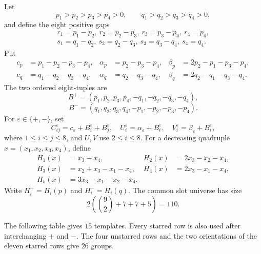 Let
\[
 p_1>p_2>p_3>p_4>0,
 \qquad q_1>q_2>q_3>q_4>0,
\]
and define the eight positive gaps
\[
\begin{gathered}
 r_1=p_1-p_2,\ r_2=p_2-p_3,\ r_3=p_3-p_4,\ r_4=p_4,\\
 s_1=q_1-q_2,\ s_2=q_2-q_3,\ s_3=q_3-q_4,\ s_4=q_4.
\end{gathered}
\]
Put
\[
\begin{aligned}
 c_p&=p_1-p_2-p_3-p_4,&
 \alpha_p&=p_2-p_3-p_4,&
 \beta_p&=2p_2-p_1-p_3-p_4,\\
 c_q&=q_1-q_2-q_3-q_4,&
 \alpha_q&=q_2-q_3-q_4,&
 \beta_q&=2q_2-q_1-q_3-q_4.
\end{aligned}
\]
The two ordered eight-tuples are
\[
 B^+=(p_1,p_2,p_3,p_4,-q_1,-q_2,-q_3,-q_4),
\]
\[
 B^-=(q_1,q_2,q_3,q_4,-p_1,-p_2,-p_3,-p_4).
\]
For $\varepsilon\in\{+,-\}$, set
\[
 C^\varepsilon_{ij}=c_\varepsilon+B^\varepsilon_i+B^\varepsilon_j,
 \quad
 U^\varepsilon_i=\alpha_\varepsilon+B^\varepsilon_i,
 \quad
 V^\varepsilon_i=\beta_\varepsilon+B^\varepsilon_i,
\]
where $1\leq i\leq j\leq8$, and $U,V$ use $2\leq i\leq8$.  For a decreasing
quadruple $x=(x_1,x_2,x_3,x_4)$, define
\[
\begin{aligned}
 H_1(x)&=x_3-x_4,& H_2(x)&=2x_3-x_2-x_4,\\
 H_3(x)&=x_2+x_3-x_1-x_4,& H_4(x)&=2x_3-x_1-x_4,\\
 H_5(x)&=3x_3-x_1-x_2-x_4.
\end{aligned}
\]
Write $H_i^+=H_i(p)$ and $H_i^-=H_i(q)$.  The common slot universe has size
\[
 2\left(\binom{9}{2}+7+7+5\right)=110.
\]

The following table gives $15$ templates.  Every starred row is also used
after interchanging $+$ and $-$.  The four unstarred rows and the two
orientations of the eleven starred rows give $26$ groups.

